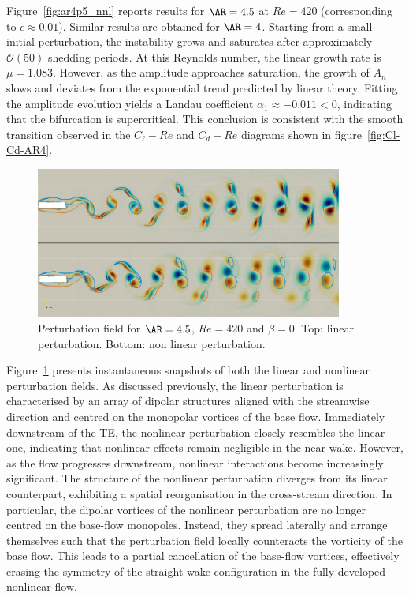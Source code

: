 Figure~\ref{fig:ar4p5_nnl} reports results for $\AR=4.5$ at $Re=420$ (corresponding to $\epsilon \approx 0.01$). Similar results are obtained for $\AR=4$. Starting from a small initial perturbation, the instability grows and saturates after approximately $\mathcal{O}(50)$ shedding periods. At this Reynolds number, the linear growth rate is $\mu = 1.083$. However, as the amplitude approaches saturation, the growth of $A_n$ slows and deviates from the exponential trend predicted by linear theory. Fitting the amplitude evolution yields a Landau coefficient $\alpha_1 \approx - 0.011<0$, indicating that the bifurcation is supercritical. This conclusion is consistent with the smooth transition observed in the $C_\ell-Re$ and $C_d-Re$ diagrams shown in figure~\ref{fig:Cl-Cd-AR4}.

\begin{figure}
  \centering
  \includegraphics[width=0.9\textwidth]{./fig/AR4p5/nl_Re420.png}
  \caption{Perturbation field for $\AR=4.5$, $Re=420$ and $\beta=0$. Top: linear perturbation. Bottom: non linear perturbation.}
  \label{fig:pert-nl}
\end{figure}

Figure~\ref{fig:pert-nl} presents instantaneous snapshots of both the linear and nonlinear perturbation fields. As discussed previously, the linear perturbation is characterised by an array of dipolar structures aligned with the streamwise direction and centred on the monopolar vortices of the base flow. Immediately downstream of the TE, the nonlinear perturbation closely resembles the linear one, indicating that nonlinear effects remain negligible in the near wake.
%
However, as the flow progresses downstream, nonlinear interactions become increasingly significant. The structure of the nonlinear perturbation diverges from its linear counterpart, exhibiting a spatial reorganisation in the cross-stream direction. In particular, the dipolar vortices of the nonlinear perturbation are no longer centred on the base-flow monopoles. Instead, they spread laterally and arrange themselves such that the perturbation field locally counteracts the vorticity of the base flow. This leads to a partial cancellation of the base-flow vortices, effectively erasing the symmetry of the straight-wake configuration in the fully developed nonlinear flow.

